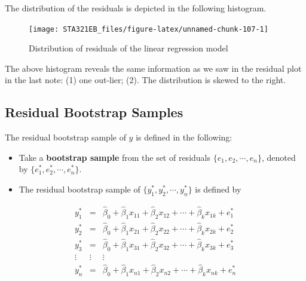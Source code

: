 \documentclass[
]{book}
\newenvironment{Shaded}{\begin{snugshade}}{\end{snugshade}}
\newcommand{\AttributeTok}[1]{\textcolor[rgb]{0.13,0.29,0.53}{#1}}
\newcommand{\DecValTok}[1]{\textcolor[rgb]{0.00,0.00,0.81}{#1}}
\newcommand{\FunctionTok}[1]{\textcolor[rgb]{0.13,0.29,0.53}{\textbf{#1}}}
\newcommand{\NormalTok}[1]{#1}
\newcommand{\SpecialCharTok}[1]{\textcolor[rgb]{0.81,0.36,0.00}{\textbf{#1}}}
\newcommand{\StringTok}[1]{\textcolor[rgb]{0.31,0.60,0.02}{#1}}
\begin{document}
The distribution of the residuals is depicted in the following histogram.

\begin{Shaded}
\end{Shaded}

\begin{figure}

{\centering \texttt{[image: STA321EB\_files/figure-latex/unnamed-chunk-107-1]} 

}

\caption{Distribution of residuals of the linear regression model}\label{fig:unnamed-chunk-107}
\end{figure}

The above histogram reveals the same information as we saw in the residual plot in the last note: (1) one out-lier; (2). The distribution is skewed to the right.

\hypertarget{residual-bootstrap-samples}{%
\subsection{Residual Bootstrap Samples}\label{residual-bootstrap-samples}}

The residual bootstrap sample of \(y\) is defined in the following:

\begin{itemize}
\item
  Take a \textbf{bootstrap sample} from the set of residuals \(\{e_1, e_2, \cdots, e_n \}\), denoted by \(\{e_1^{*}, e_2^{*}, \cdots, e_n^{*} \}\).
\item
  The residual bootstrap sample of \(\{y_1^{*}, y_2^{*}, \cdots, y_n^{*} \}\) is defined by
\end{itemize}

\[
\begin{array}{ccc} 
y_1^{*} & = &  \hat{\beta}_0 + \hat{\beta}_1 x_{11} + \hat{\beta}_2 x_{12} + \cdots + \hat{\beta}_k x_{1k} + e_1^{*}  \\
y_2^{*} & = &  \hat{\beta}_0 + \hat{\beta}_1 x_{21} + \hat{\beta}_2 x_{22} + \cdots + \hat{\beta}_k x_{2k} + e_2^{*}  \\
y_3^{*} & = &  \hat{\beta}_0 + \hat{\beta}_1 x_{31} + \hat{\beta}_2 x_{32} + \cdots + \hat{\beta}_k x_{3k} + e_3^{*}  \\
\vdots & \vdots & \vdots \\
y_n^{*} & = &  \hat{\beta}_0 + \hat{\beta}_1 x_{n1} + \hat{\beta}_2 x_{n2} + \cdots + \hat{\beta}_k x_{nk} + e_n^{*}
\end{array}
\]
\end{document}
